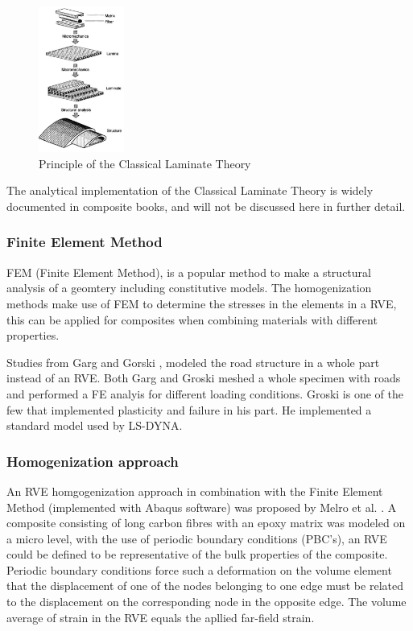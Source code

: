 \begin{figure}[H]
    \centering
    \includegraphics[width=0.25\textwidth]{chapter_2/figures/CompositeTheory.PNG}
    \caption{Principle of the Classical Laminate Theory \cite{Daniel2006EngineeringMaterials}}
    \label{fig:Transverseraster}
\end{figure}
The analytical implementation of the Classical Laminate Theory is widely documented in composite books, and will not be discussed here in further detail. 

\subsubsection{Finite Element Method}    
\label{FiniteElementMethod}
FEM (Finite Element Method), is a popular method to make a structural analysis of a geomtery including constitutive models. The homogenization methods make use of FEM to determine the stresses in the elements in a RVE, this can be applied for composites when combining materials with different properties.

Studies from Garg \cite{Garg2017AnStudy} and Gorski \cite{Gorski2015ComputationMethod}, modeled the road structure in a whole part instead of an RVE. Both Garg \cite{Garg2017AnStudy} and Groski meshed a whole  specimen with roads and performed a FE analyis for different loading conditions. Groski is one of the few that implemented plasticity and failure in his part. He implemented a standard model used by LS-DYNA.  


\subsubsection{Homogenization approach}
An RVE homgogenization approach in combination with the Finite Element Method (implemented with Abaqus software) was proposed by Melro et al. \cite{Melro2012InfluenceMaterials}. A composite consisting of long carbon fibres with an epoxy matrix was modeled on a micro level, with the use of periodic boundary conditions (PBC's), an RVE could be defined to be representative of the bulk properties of the composite. Periodic boundary conditions force such a deformation on the volume element that the displacement of one of the nodes belonging to one edge must be related to the displacement on the corresponding node in the opposite edge\cite{Melro2012InfluenceMaterials}. The volume average of strain in the RVE equals the apllied far-field strain.

